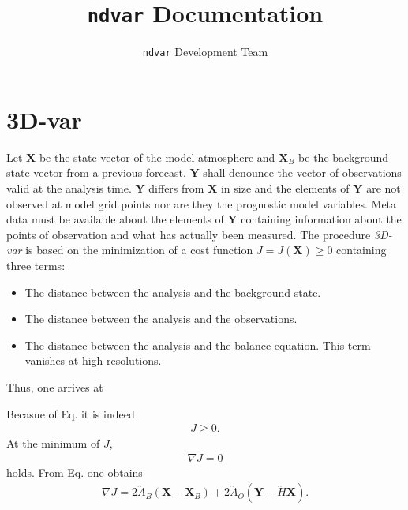 \documentclass{article}
\title{\texttt{ndvar} Documentation}
\author{\texttt{ndvar} Development Team}
\date{}
\begin{document}
\maketitle

\section{3D-var}
\label{sec:3d-var}

Let $\mathbf{X}$ be the state vector of the model atmosphere and $\mathbf{X}_B$ be the background state vector from a previous forecast. $\mathbf{Y}$ shall denounce the vector of observations valid at the analysis time. $\mathbf{Y}$ differs from $\mathbf{X}$ in size and the elements of $\mathbf{Y}$ are not observed at model grid points nor are they the prognostic model variables. Meta data must be available about the elements of $\mathbf{Y}$ containing information about the points of observation and what has actually been measured. The procedure \textit{3D-var} is based on the minimization of a cost function $J = J\left(\mathbf{X}\right) \geq 0$ containing three terms:
%
\begin{itemize}
\item The distance between the analysis and the background state.
\item The distance between the analysis and the observations.
\item The distance between the analysis and the balance equation. This term vanishes at high resolutions.
\end{itemize}

Thus, one arrives at
%
\begin{center}
\end{center}
%
Becasue of Eq. it is indeed
%
\begin{eqnarray}
J \geq 0.
\end{eqnarray}
%
At the minimum of $J$,
%
\begin{eqnarray}
\nabla J = 0
\end{eqnarray}
%
holds. From Eq. one obtains
%
\begin{eqnarray}
\nabla J = 2\overleftrightarrow{A}_B\left(\mathbf{X} - \mathbf{X}_B\right) + 2\overleftrightarrow{A}_O\left(\mathbf{Y} - \overleftrightarrow{H}\mathbf{X}\right).
\end{eqnarray}
\end{document}
